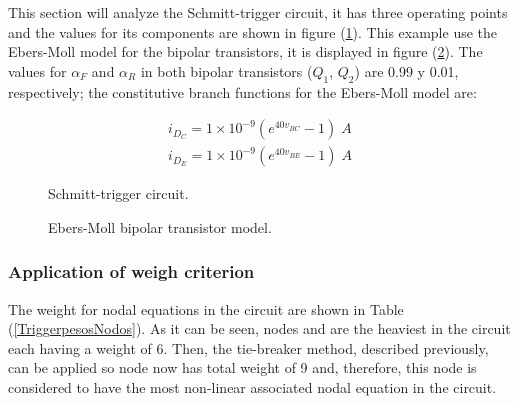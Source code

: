 \documentclass[conference,letterpaper,onecolumn,11pt]{IEEEtran}
\begin{document}
This section will analyze the Schmitt-trigger circuit, it has three operating points and the values for its components are shown in figure (\ref{Ftrigger}). This example use the Ebers-Moll model for the bipolar transistors, it is displayed in figure (\ref{FEbersMoll}). The values for $\alpha_F$ and $\alpha_R$ in both bipolar transistors ($Q_1$, $Q_2$) are 0.99 y 0.01, respectively; the constitutive branch functions for the Ebers-Moll model are:

\begin{displaymath}
\begin{array}{r}
i_{D_C}= 1\times 10^{-9} (e^{40v_{BC}}-1) \;A \\
i_{D_E}= 1\times 10^{-9} (e^{40v_{BE}}-1) \;A
\end{array}
\end{displaymath}

\begin{figure}[!h]
\centerline{
\epsfxsize=80mm
}
\caption{Schmitt-trigger circuit.}
\label{Ftrigger}
\end{figure}

\begin{figure}[!h]
\centerline{
\epsfxsize=40mm
}
\caption{Ebers-Moll bipolar transistor model.}
\label{FEbersMoll}
\end{figure}

\subsubsection{Application of weigh criterion}

The weight for nodal equations in the circuit are shown in Table (\ref{TriggerpesosNodos}). As it can be seen, nodes  and  are the heaviest in the circuit each having a weight of 6. Then, the tie-breaker method, described previously, can be applied so node  now has total weight of 9 and, therefore, this node is considered to have the most non-linear associated nodal equation in the circuit.

\begin{table}[!hb]
\caption{Node weights for the Schmitt-trigger circuit.}
\label{TriggerpesosNodos}
\end{table}
\end{document}
